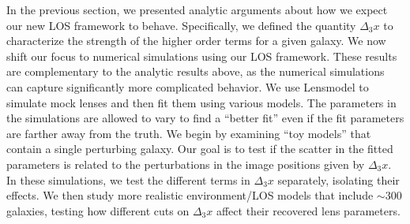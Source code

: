 In the previous section, we presented analytic arguments about how we expect our new LOS framework to behave. Specifically, we defined the quantity $\Delta_3 x$ to characterize the strength of the higher order terms for a given galaxy. We now shift our focus to numerical simulations using our LOS framework. These results are complementary to the analytic results above, as the numerical simulations can capture significantly more complicated behavior. We use Lensmodel \citep{Keeton01} to simulate mock lenses and then fit them using various models. The parameters in the simulations are allowed to vary to find a ``better fit'' even if the fit parameters are farther away from the truth. We begin by examining ``toy models'' that contain a single perturbing galaxy. Our goal is to test if the scatter in the fitted parameters is related to the perturbations in the image positions given by $\Delta_3 x$. In these simulations, we test the different terms in $\Delta_3 x$ separately, isolating their effects. We then study more realistic environment/LOS models that include $\sim 300$ galaxies, testing how different cuts on $\Delta_3 x$ affect their recovered lens parameters.
